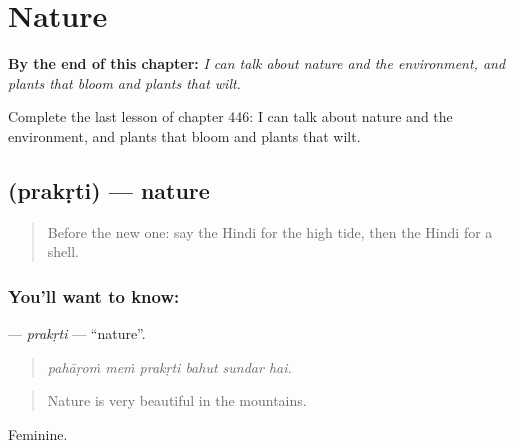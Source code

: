 
\chapter{Nature}
\label{ch:hi-nature}

\begin{chapteropening}
\textbf{By the end of this chapter:} \emph{I can talk about nature and the environment, and plants that bloom and plants that wilt.}

Complete the last lesson of chapter 446: I can talk about nature and the environment, and plants that bloom and plants that wilt.
\end{chapteropening}

\section[\texorpdfstring{\hi{प्रकृति} (prakṛti)}{प्रकृति (prakṛti)}]{ (prakṛti) — nature}

\label{lesson:HI-C446-prakrti}



\begin{quote}
Before the new one: say the Hindi for the high tide, then the Hindi for a shell.
\end{quote}

\subsection*{You'll want to know: }
\textbf{} — \emph{prakṛti} — \textquotedblleft{}nature\textquotedblright{}.

\begin{quote}
     
\end{quote}

\begin{quote}
\emph{pahāṛoṁ meṁ prakṛti bahut sundar hai.}
\end{quote}

\begin{quote}
Nature is very beautiful in the mountains.
\end{quote}

Feminine.

